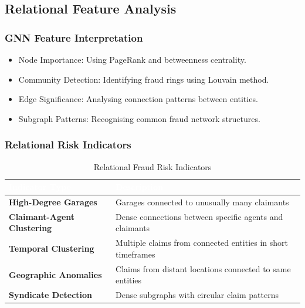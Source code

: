 \documentclass[12pt,a4paper,oneside]{report}
\numberwithin{equation}{chapter}
\renewcommand{\arraystretch}{1.6}
\begin{document}
\subsection{Relational Feature Analysis}
\label{subsec:relational-feature-analysis}

\subsubsection{GNN Feature Interpretation}

\begin{itemize}
    \item Node Importance: Using PageRank and betweenness centrality.
    \item Community Detection: Identifying fraud rings using Louvain method.
    \item Edge Significance: Analysing connection patterns between entities.
    \item Subgraph Patterns: Recognising common fraud network structures.
\end{itemize}

\subsubsection{Relational Risk Indicators}

\begin{table}[H]
\centering
\caption{Relational Fraud Risk Indicators}
\label{tab:relational_fraud_indicators}
\renewcommand{\arraystretch}{1.4}
\begin{tabular}{L{5cm} L{8cm}}
\toprule
{}
\textcolor{white}{\textbf{Indicator Type}} &
\textcolor{white}{\textbf{Description}} \\
\midrule
{}
\textbf{High-Degree Garages} & Garages connected to unusually many claimants \\
\textbf{Claimant-Agent Clustering} & Dense connections between specific agents and claimants \\
\textbf{Temporal Clustering} & Multiple claims from connected entities in short timeframes \\
\textbf{Geographic Anomalies} & Claims from distant locations connected to same entities \\
\textbf{Syndicate Detection} & Dense subgraphs with circular claim patterns \\
\bottomrule
\end{tabular}
\end{table}
\end{document}
